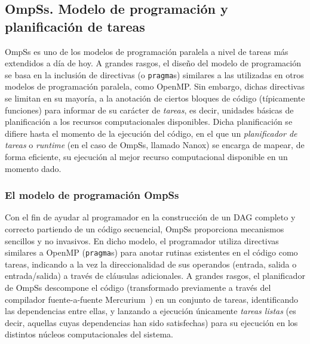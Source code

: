 %
%
%
%

\subsection{OmpSs. Modelo de programación y planificación de tareas}

OmpSs es uno de los modelos de programación paralela a nivel de tareas más extendidos a día de hoy. A grandes
rasgos, el diseño del modelo de programación se basa en la inclusión de directivas (o {\tt pragma}s) similares
a las utilizadas en otros modelos de programación paralela, como OpenMP. Sin embargo, dichas directivas se limitan
en su mayoría, a la anotación de ciertos bloques de código (típicamente funciones) para informar de su carácter de
{\em tareas}, es decir, unidades básicas de planificación a los recursos computacionales disponibles. Dicha planificación
se difiere hasta el momento de la ejecución del código, en el que un {\em planificador de tareas} o 
{\em runtime} (en el caso de OmpSs, llamado Nanox) se encarga de mapear, de forma eficiente, su ejecución al 
mejor recurso computacional disponible en un momento dado.  

\subsubsection{El modelo de programación OmpSs}

Con el fin de ayudar al programador en la construcción de un DAG completo y correcto partiendo de un código secuencial,
OmpSs proporciona mecanismos sencillos y no invasivos. En dicho modelo, el programador 
utiliza directivas similares a OpenMP ({\tt pragma}s) para anotar rutinas existentes en el código como tareas, indicando
a la vez la direccionalidad de sus operandos (entrada, salida o entrada/salida) a través de cláusulas adicionales. A 
grandes rasgos, el planificador de OmpSs descompone el código (transformado previamente a través del compilador 
fuente-a-fuente Mercurium~\cite{Mercurium}) en un conjunto de tareas, identificando las dependencias entre ellas, 
y lanzando a ejecución únicamente {\em tareas listas} (es decir, aquellas cuyas dependencias han sido satisfechas)
para su ejecución en los distintos núcleos computacionales del sistema.

